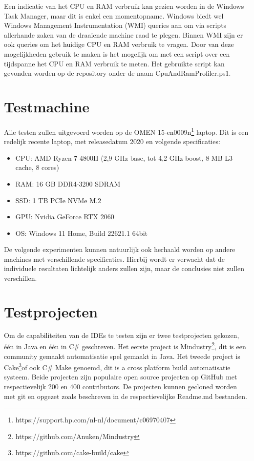 Een indicatie van het CPU en RAM verbruik kan gezien worden in de Windows Task Manager, maar dit is enkel een momentopname. Windows biedt wel Windows Management Instrumentation (WMI) queries aan om via scripts allerhande zaken van de draaiende machine raad te plegen. Binnen WMI zijn er ook queries om het huidige CPU en RAM verbruik te vragen. Door van deze mogelijkheden gebruik te maken is het mogelijk om met een script over een tijdspanne het CPU en RAM verbruik te meten. Het gebruikte script kan gevonden worden op de repository onder de naam CpuAndRamProfiler.ps1.

\newpage

\section{Testmachine}
Alle testen zullen uitgevoerd worden op de OMEN 15-en0009n\footnote{https://support.hp.com/nl-nl/document/c06970407} laptop. Dit is een redelijk recente laptop, met releasedatum 2020 en volgende specificaties:

\begin{itemize}
	\item 	CPU: AMD Ryzen 7 4800H (2,9 GHz base, tot 4,2 GHz boost, 8 MB L3 cache, 8 cores)
	\item RAM: 16 GB DDR4-3200 SDRAM
	\item SSD: 1 TB PCIe NVMe M.2
	\item GPU: Nvidia GeForce RTX 2060
	\item OS: Windows 11 Home, Build 22621.1 64bit
\end{itemize}

De volgende experimenten kunnen natuurlijk ook herhaald worden op andere machines met verschillende specificaties. Hierbij wordt er verwacht dat de individuele resultaten lichtelijk anders zullen zijn, maar de conclusies niet zullen verschillen.

\newcommand{\cakeRepoFN}{\footnote{https://github.com/cake-build/cake}}
\newcommand{\mindustryRepoFN}{\footnote{https://github.com/Anuken/Mindustry}}

\section{Testprojecten}
Om de capabiliteiten van de IDEs te testen zijn er twee testprojecten gekozen, één in Java en één in C\# geschreven. Het eerste project is Mindustry\mindustryRepoFN, dit is een community gemaakt automatisatie spel gemaakt in Java. Het tweede project is Cake\cakeRepoFN of ook C\# Make genoemd, dit  is a cross platform build automatisatie systeem. Beide projecten zijn populaire open source projecten op GitHub met respectievelijk 200 en 400 contributors. De projecten kunnen gecloned worden met git en opgezet zoals beschreven in de respectievelijke Readme.md bestanden.

